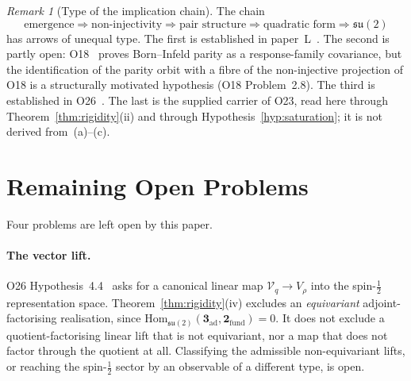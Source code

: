 \documentclass[11pt,a4paper]{article}
\theoremstyle{remark}
\newtheorem{remark}[theorem]{Remark}
\begin{document}
  \begin{remark}[Type of the implication chain]
    \label{rem:chain}
    The chain
    \[
      \text{emergence} \Rightarrow \text{non-injectivity} \Rightarrow \text{pair structure}
      \Rightarrow \text{quadratic form} \Rightarrow \mathfrak{su}(2)
    \]
    has arrows of unequal type.
    The first is established in paper~L~\cite{Beau2026l}.
    The second is partly open: O18~\cite{Beau2026a22} proves Born--Infeld parity as a
    response-family covariance, but the identification of the parity orbit with a fibre of the
    non-injective projection of O18 is a structurally motivated hypothesis (O18 Problem~2.8).
    The third is established in O26~\cite{Beau2026a30}.
    The last is the supplied carrier of O23, read here through Theorem~\ref{thm:rigidity}(ii) and
    through Hypothesis~\ref{hyp:saturation}; it is not derived from~(a)--(c).
  \end{remark}

  \section{Remaining Open Problems}
  \label{sec:open}

  Four problems are left open by this paper.

  \paragraph{The vector lift.}
  O26 Hypothesis~4.4~\cite{Beau2026a30} asks for a canonical linear map $\mathcal{V}_q \to V_\rho$
  into the spin-$\tfrac{1}{2}$ representation space.
  Theorem~\ref{thm:rigidity}(iv) excludes an \emph{equivariant} adjoint-factorising realisation,
  since $\mathrm{Hom}_{\mathfrak{su}(2)}(\mathbf{3}_{\mathrm{ad}}, \mathbf{2}_{\mathrm{fund}}) = 0$.
  It does not exclude a quotient-factorising linear lift that is not equivariant, nor a map that
  does not factor through the quotient at all.
  Classifying the admissible non-equivariant lifts, or reaching the spin-$\tfrac{1}{2}$ sector by an
  observable of a different type, is open.
\end{document}
